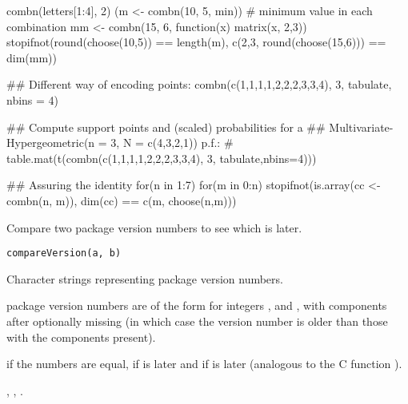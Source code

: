 %
\begin{Examples}
\begin{ExampleCode}
combn(letters[1:4], 2)
(m <- combn(10, 5, min))   # minimum value in each combination
mm <- combn(15, 6, function(x) matrix(x, 2,3))
stopifnot(round(choose(10,5)) == length(m),
          c(2,3, round(choose(15,6))) == dim(mm))

## Different way of encoding points:
combn(c(1,1,1,1,2,2,2,3,3,4), 3, tabulate, nbins = 4)

## Compute support points and (scaled) probabilities for a
## Multivariate-Hypergeometric(n = 3, N = c(4,3,2,1)) p.f.:
# table.mat(t(combn(c(1,1,1,1,2,2,2,3,3,4), 3, tabulate,nbins=4)))

## Assuring the identity
for(n in 1:7)
 for(m in 0:n) stopifnot(is.array(cc <- combn(n, m)),
                         dim(cc) == c(m, choose(n,m)))
\end{ExampleCode}
\end{Examples}
%
\begin{Description}\relax
Compare two package version numbers to see which is later.
\end{Description}
%
\begin{Usage}
\begin{verbatim}
compareVersion(a, b)
\end{verbatim}
\end{Usage}
%
\begin{Arguments}
\begin{ldescription}
\item[\code{a, b}] Character strings representing package version numbers.
\end{ldescription}
\end{Arguments}
%
\begin{Details}\relax
\R{} package version numbers are of the form  for integers
,  and , with components after 
optionally missing (in which case the version number is older than
those with the components present). 
\end{Details}
%
\begin{Value}
 if the numbers are equal,  if  is later
and  if  is later (analogous to the C function
).
\end{Value}
%
\begin{SeeAlso}\relax
{},
, .
\end{SeeAlso}
